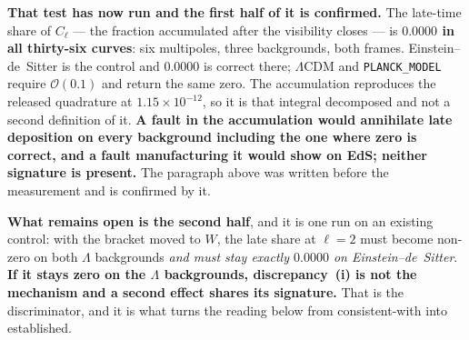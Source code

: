 \textbf{That test has now run and the first half of it is confirmed.} The
late-time share of $C_\ell$ --- the fraction accumulated after the visibility
closes --- is \textbf{$0.0000$ in all thirty-six curves}: six multipoles,
three backgrounds, both frames. Einstein--de~Sitter is the control and
$0.0000$ is correct there; $\Lambda$CDM and \texttt{PLANCK\_MODEL} require
$\mathcal O(0.1)$ and return the same zero. The accumulation reproduces the
released quadrature at $1.15\times10^{-12}$, so it is that integral decomposed
and not a second definition of it. \textbf{A fault in the accumulation would
annihilate late deposition on every background including the one where zero is
correct, and a fault manufacturing it would show on EdS; neither signature is
present.} The paragraph above was written before the measurement and is
confirmed by it.

\textbf{What remains open is the second half}, and it is one run on an
existing control: with the bracket moved to $W$, the late share at $\ell=2$
must become non-zero on both $\Lambda$ backgrounds \emph{and must stay
exactly $0.0000$ on Einstein--de~Sitter}. \textbf{If it stays zero on the
$\Lambda$ backgrounds, discrepancy~(i) is not the mechanism and a second
effect shares its signature.} That is the discriminator, and it is what turns
the reading below from consistent-with into established.
